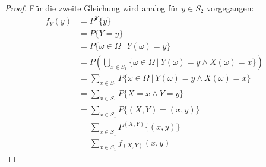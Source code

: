 \documentclass[a4paper]{scrartcl}
\begin{document}
\begin{enumerate}[label=\bfseries\arabic*.]
\begin{enumerate}[label=(\alph*)]
\begin{proof}
                    Für die zweite Gleichung wird analog für $y \in S_2$
                    vorgegangen:
                    \begin{equation*}
                        \begin{split}
                            f_Y(y) &= P^Y\{ y \} \\
                            &= P\{ Y = y \} \\
                            &= P\{ \omega \in \Omega \ |\ Y(\omega) = y \} \\
                            &= P \left( \bigcup_{x \in S_1}
                                \{ \omega \in \Omega \ |\ Y(\omega) = y
                                \land X(\omega) = x \} \right) \\
                            &= \sum_{x \in S_1} P \{ \omega \in \Omega \ |\ 
                                Y(\omega) = y \land X(\omega) = x \} \\
                            &= \sum_{x \in S_1} P \{ X = x \land Y = y \} \\
                            &= \sum_{x \in S_1} P \{ (X, Y) = (x, y) \} \\
                            &= \sum_{x \in S_1} P^{(X, Y)} \{ (x, y) \} \\
                            &= \sum_{x \in S_1} f_{(X, Y)} (x, y)
                        \end{split}
                    \end{equation*}

                \end{proof}


\end{enumerate}
\end{enumerate}
\end{document}
